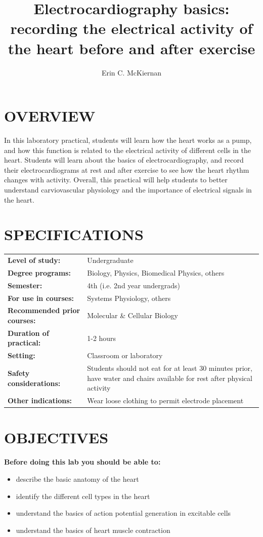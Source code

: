 \documentclass[12pt]{article}
\title{\vspace{-1.8cm}\Large{\textbf{Electrocardiography basics: recording the electrical activity of the heart before and after exercise}}}
\author[1]{Erin C. McKiernan}
\affil[1]{\small{Departamento de F\'isica, Facultad de Ciencias, Universidad Nacional Aut\'onoma de M\'exico}}
\date{}
\begin{document}
\maketitle

\section*{OVERVIEW}
In this laboratory practical, students will learn how the heart works
as a pump, and how this function is related to the electrical activity
of different cells in the heart. Students will learn about the basics
of electrocardiography, and record their
electrocardiograms at rest and after exercise to see how the heart
rhythm changes with activity. Overall, this practical will help
students to better understand carviovascular physiology and the
importance of electrical signals in the heart.

\section*{SPECIFICATIONS}
\begin{tabular}{p{6cm} p{10cm}}
\textbf{Level of study:} & Undergraduate \\
\textbf{Degree programs:} & Biology, Physics, Biomedical Physics, others \\
\textbf{Semester:} & 4th (i.e. 2nd year undergrads) \\ 
\textbf{For use in courses:} & Systems Physiology, others \\
\textbf{Recommended prior courses:} & Molecular \& Cellular Biology \\
\textbf{Duration of practical:} & 1-2 hours \\
\textbf{Setting:} & Classroom or laboratory \\
\textbf{Safety considerations:} & Students should not eat for at least 30 minutes prior, have water and chairs available for rest after physical activity \\
\textbf{Other indications:} & Wear loose clothing to permit electrode placement
\end{tabular}

\section*{OBJECTIVES}
\textbf{Before doing this lab you should be able to:}
\begin{itemize}
\item describe the basic anatomy of the heart
\item identify the different cell types in the heart
\item understand the basics of action potential generation in excitable cells
\item understand the basics of heart muscle contraction
\end{itemize}
 
\end{document}
